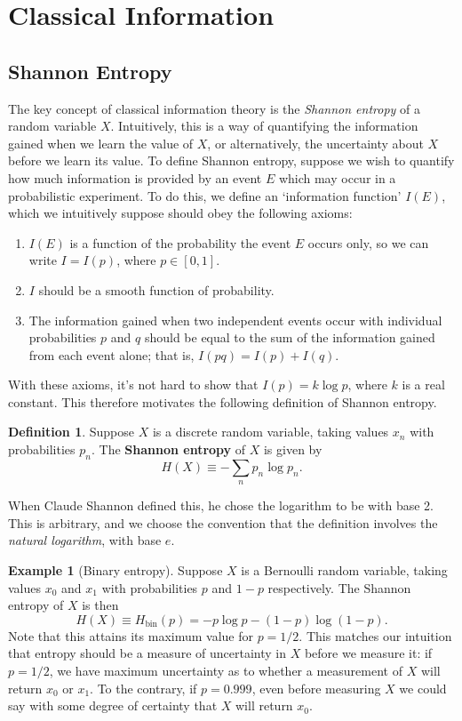 \documentclass[12pt,a4paper]{report}
\numberwithin{equation}{section}
\theoremstyle{definition}
\newtheorem{definition}{Definition}[section]
\theoremstyle{theorem}
\theoremstyle{theorem}
\theoremstyle{example}
\newtheorem{example}{Example}[section]
\theoremstyle{definition}
\begin{document}
\section{Classical Information}
\subsection{Shannon Entropy}
The key concept of classical information theory is the \textit{Shannon entropy} of a random variable $X$. Intuitively, this is a way of quantifying the information gained when we learn the value of $X$, or alternatively, the uncertainty about $X$ before we learn its value. To define Shannon entropy, suppose we wish to quantify how much information is provided by an event $E$ which may occur in a probabilistic experiment. To do this, we define an `information function' $I(E)$, which we intuitively suppose should obey the following axioms:
\begin{enumerate}
	\item $I(E)$ is a function of the probability the event $E$ occurs only, so we can write $I=I(p)$, where $p\in[0,1]$.
	\item $I$ should be a smooth function of probability.
	\item The information gained when two independent events occur with individual probabilities $p$ and $q$ should be equal to the sum of the information gained from each event alone; that is, $I(pq)=I(p)+I(q)$.
\end{enumerate}
With these axioms, it's not hard to show that $I(p)=k\log{p}$, where $k$ is a real constant. This therefore motivates the following definition of Shannon entropy.
\begin{definition}
	Suppose $X$ is a discrete random variable, taking values $x_{n}$ with probabilities $p_{n}$. The \textbf{Shannon entropy} of $X$ is given by
	\begin{equation}
		H(X)\equiv-\sum_{n}p_{n}\log{p_{n}}.
	\end{equation}
\end{definition}
When Claude Shannon defined this, he chose the logarithm to be with base 2. This is arbitrary, and we choose the convention that the definition involves the \textit{natural logarithm}, with base $e$.
\begin{example}[Binary entropy]
	Suppose $X$ is a Bernoulli random variable, taking values $x_{0}$ and $x_{1}$ with probabilities $p$ and $1-p$ respectively. The Shannon entropy of $X$ is then
	\begin{equation}
		H(X)\equiv H_{\text{bin}}(p)=-p\log{p}-(1-p)\log{(1-p)}.
	\end{equation}
	Note that this attains its maximum value for $p=1/2$. This matches our intuition that entropy should be a measure of uncertainty in $X$ before we measure it: if $p=1/2$, we have maximum uncertainty as to whether a measurement of $X$ will return $x_{0}$ or $x_{1}$. To the contrary, if $p=0.999$, even before measuring $X$ we could say with some degree of certainty that $X$ will return $x_{0}$.
\end{example}
\end{document}
